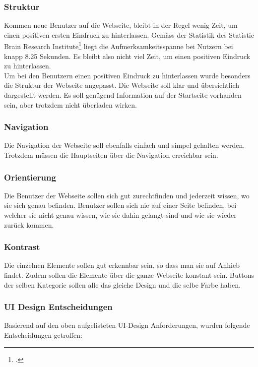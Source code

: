 \newpage

\subsubsection*{Struktur}
Kommen neue Benutzer auf die Webseite, bleibt in der Regel wenig Zeit, um einen positiven ersten Eindruck zu hinterlassen. Gemäss der Statistik des Statistic Brain Research Institute\footcite{attention_span_statistic} liegt die Aufmerksamkeitsspanne bei Nutzern bei knapp 8.25 Sekunden. Es bleibt also nicht viel Zeit, um einen positiven Eindruck zu hinterlassen. \\

Um bei den Benutzern einen positiven Eindruck zu hinterlassen wurde besonders die Struktur der Webseite angepasst. Die Webseite soll klar und übersichtlich dargestellt werden. Es soll genügend Information auf der Startseite vorhanden sein, aber trotzdem nicht überladen wirken.

\subsubsection*{Navigation}
Die Navigation der Webseite soll ebenfalls einfach und simpel gehalten werden. Trotzdem müssen die Hauptseiten über die Navigation erreichbar sein.
	
\subsubsection*{Orientierung}
Die Benutzer der Webseite sollen sich gut zurechtfinden und jederzeit wissen, wo sie sich genau befinden. Benutzer sollen sich nie auf einer Seite befinden, bei welcher sie nicht genau wissen, wie sie dahin gelangt sind und wie sie wieder zurück kommen.

\subsubsection*{Kontrast}
Die einzelnen Elemente sollen gut erkennbar sein, so dass man sie auf Anhieb findet. Zudem sollen die Elemente über die ganze Webseite konstant sein. Buttons der selben Kategorie sollen alle das gleiche Design und die selbe Farbe haben.

\newpage

\subsubsection{UI Design Entscheidungen}
Basierend auf den oben aufgelisteten UI-Design Anforderungen, wurden folgende Entscheidungen getroffen:

